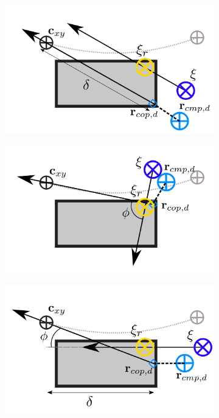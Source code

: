 \begin{figure}[h]
\centering
  \begin{subfigure}{0.49\textwidth}
    \centering
  \includegraphics[width=.7\linewidth]{STYLESTUFF/ICPplanStartSSPhiViz0.png}
    \caption{}
     \label{fig:phiVizc}
  \end{subfigure}
  \begin{subfigure}{0.49\textwidth}
    \centering
  \includegraphics[width=.7\linewidth]{STYLESTUFF/ICPplanStartSSPhiViz90.png}
    \caption{}
     \label{fig:phiVizd}
  \end{subfigure}
  \begin{subfigure}{0.49\textwidth}
  \centering
  \includegraphics[width=.7\linewidth]{STYLESTUFF/ICPplanStartSSPhiVizNegError.png}
   \caption{}
    \label{fig:phiViza}
  \end{subfigure}
  \begin{subfigure}{0.49\textwidth}

\end{subfigure}
\end{figure}
